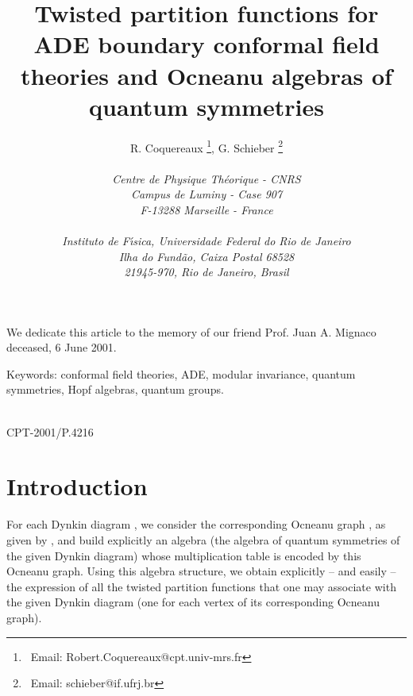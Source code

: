 \documentclass[a4paper,11pt]{article}
\title{
Twisted partition functions for ADE boundary conformal field theories
       and Ocneanu algebras of quantum  symmetries
         \vspace{0.8cm}}
\author{R. Coquereaux\myHighlight{${}^{1}$}\coordHE{}  \thanks{~Email:
Robert.Coquereaux@cpt.univ-mrs.fr}\myHighlight{$\;$}\coordHE{},
              G. Schieber\myHighlight{${}^{1,}$}\coordHE{}  \myHighlight{${}^2$}\coordHE{} \thanks{~Email:
schieber@if.ufrj.br} \\
\\
\myHighlight{${}^1$}\coordHE{} {\it Centre de Physique Th\'eorique - CNRS} \\
             {\it Campus de Luminy - Case 907}           \\
             {\it F-13288 Marseille - France}            \\
\\
\myHighlight{${}^2$}\coordHE{} {\it Instituto de F\'{\i}sica, Universidade Federal do Rio de
Janeiro} \\
             {\it Ilha do Fund\~ao, Caixa Postal 68528}\\
             {\it 21945-970, Rio de Janeiro, Brasil}\\
}
\date{}
\let\sect=\section
\def\section{\newpage\sect}
\begin{document}
\thispagestyle{empty}
\begin{titlepage}
\maketitle
{}

\vspace{1.cm}

\begin{center}
We dedicate this article to the memory of our friend  Prof. Juan A. Mignaco
deceased, 6 June 2001.
\end{center}



\vspace{2. cm}

\noindent Keywords: conformal field theories, ADE, modular invariance,
quantum symmetries, Hopf algebras, quantum groups.
\vspace{1.0cm}


\vspace{2. cm}

\\
\noindent CPT-2001/P.4216 \\


\vspace*{0.3 cm}

\end{titlepage}




\section{Introduction}

For each \coordHE{} Dynkin diagram \coordHE{}, we consider the corresponding
Ocneanu graph \coordHE{}, as given by \coordHE{}, and build
explicitly an algebra (the algebra of quantum symmetries
of the given Dynkin diagram)
whose multiplication table is encoded by this Ocneanu graph. Using
this algebra structure, we obtain explicitly -- and easily -- the
expression of all
the twisted partition functions that one may associate with
the given Dynkin diagram (one for each vertex of its corresponding
Ocneanu graph).
\end{document}
